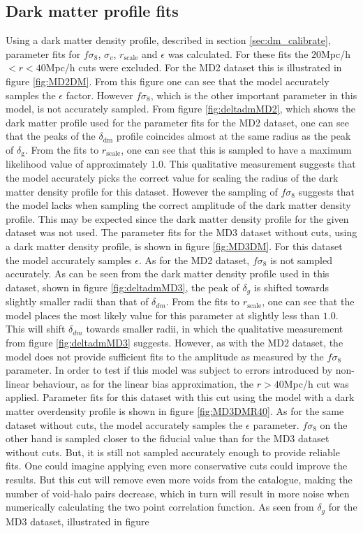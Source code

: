 \subsection{Dark matter profile fits}
Using a dark matter density profile, described in section \ref{sec:dm_calibrate}, parameter fits for $f\sigma_8$, $\sigma_v$, $r_\mathrm{scale}$ and $\epsilon$ was calculated. For these fits the $20$Mpc/h$<r<40$Mpc/h cuts were excluded. For the MD2 dataset this is illustrated in figure \ref{fig:MD2DM}. From this figure one can see that the model accurately samples the $\epsilon$ factor. However $f\sigma_8$, which is the other important parameter in this model, is not accurately sampled. From figure \ref{fig:deltadmMD2}, which shows the dark matter profile used for the parameter fits for the MD2 dataset, one can see that the peaks of the $\delta_{\mathrm{dm}}$ profile coincides almost at the same radius as the peak of $\delta_\mathrm{g}$. From the fits to $r_\mathrm{scale}$, one can see that this is sampled to have a maximum likelihood value of approximately $1.0$. This qualitative measurement suggests that the model accurately picks the correct value for scaling the radius of the dark matter density profile for this dataset. However the sampling of $f\sigma_8$ suggests that the model lacks when sampling the correct amplitude of the dark matter density profile. This may be expected since the dark matter density profile for the given dataset was not used. The parameter fits for the MD3 dataset without cuts, using a dark matter density profile, is shown in figure \ref{fig:MD3DM}. For this dataset the model accurately samples $\epsilon$. As for the MD2 dataset, $f\sigma_8$ is not sampled accurately. As can be seen from the dark matter density profile used in this dataset, shown in figure \ref{fig:deltadmMD3}, the peak of $\delta_g$ is shifted towards slightly smaller radii than that of $\delta_{dm}$. From the fits to $r_{\mathrm{scale}}$, one can see that the model places the most likely value for this parameter at slightly less than $1.0$. This will shift $\delta_{dm}$ towards smaller radii, in which the qualitative measurement from figure \ref{fig:deltadmMD3} suggests. However, as with the MD2 dataset, the model does not provide sufficient fits to the amplitude as measured by the $f\sigma_8$ parameter. In order to test if this model was subject to errors introduced by non-linear behaviour, as for the linear bias approximation, the $r>40$Mpc/h cut was applied. Parameter fits for this dataset with this cut using the model with a dark matter overdensity profile is shown in figure \ref{fig:MD3DMR40}. As for the same dataset without cuts, the model accurately samples the $\epsilon$ parameter. $f\sigma_8$ on the other hand is sampled closer to the fiducial value than for the MD3 dataset without cuts. But, it is still not sampled accurately enough to provide reliable fits. One could imagine applying even more conservative cuts could improve the results. But this cut will remove even more voids from the catalogue, making the number of void-halo pairs decrease, which in turn will result in more noise when numerically calculating the two point correlation function. As seen from $\delta_g$ for the MD3 dataset, illustrated in figure 